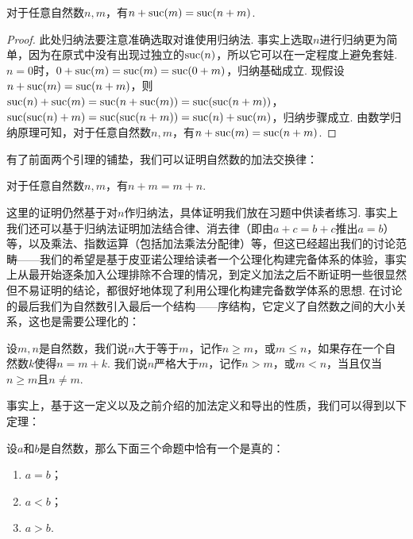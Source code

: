 \begin{lemma}
    对于任意自然数$n,m$，有$n+\operatorname{suc}(m)=\operatorname{suc}(n+m)$.
\end{lemma}
\begin{proof}
    此处归纳法要注意准确选取对谁使用归纳法. 事实上选取$n$进行归纳更为简单，因为在原式中没有出现过独立的$\operatorname{suc}(n)$，所以它可以在一定程度上避免套娃. $n=0$时，$0+\operatorname{suc}(m)=\operatorname{suc}(m)=\operatorname{suc}(0+m)$，归纳基础成立. 现假设$n+\operatorname{suc}(m)=\operatorname{suc}(n+m)$，则$\operatorname{suc}(n)+\operatorname{suc}(m)=\operatorname{suc}(n+\operatorname{suc}(m))=\operatorname{suc}(\operatorname{suc}(n+m))$，$\operatorname{suc}(\operatorname{suc}(n)+m)=\operatorname{suc}(\operatorname{suc}(n+m))=\operatorname{suc}(n)+\operatorname{suc}(m)$，归纳步骤成立. 由数学归纳原理可知，对于任意自然数$n,m$，有$n+\operatorname{suc}(m)=\operatorname{suc}(n+m)$.
\end{proof}

有了前面两个引理的铺垫，我们可以证明自然数的加法交换律：

\begin{theorem}%
    对于任意自然数$n,m$，有$n+m=m+n$.
\end{theorem}
这里的证明仍然基于对$n$作归纳法，具体证明我们放在习题中供读者练习. 事实上我们还可以基于归纳法证明加法结合律、消去律（即由$a+c=b+c$推出$a=b$）等，以及乘法、指数运算（包括加法乘法分配律）等，但这已经超出我们的讨论范畴——我们的希望是基于皮亚诺公理给读者一个公理化构建完备体系的体验，事实上从最开始逐条加入公理排除不合理的情况，到定义加法之后不断证明一些很显然但不易证明的结论，都很好地体现了利用公理化构建完备数学体系的思想. 在讨论的最后我们为自然数引入最后一个结构——序结构，它定义了自然数之间的大小关系，这也是需要公理化的：

\begin{definition}%
    设$m,n$是自然数，我们说$n$大于等于$m$，记作$n\geqslant m$，或$m\leqslant n$，如果存在一个自然数$k$使得$n=m+k$. 我们说$n$严格大于$m$，记作$n>m$，或$m<n$，当且仅当$n\geqslant m$且$n\neq m$.
\end{definition}

事实上，基于这一定义以及之前介绍的加法定义和导出的性质，我们可以得到以下定理：

\begin{theorem}
    设$a$和$b$是自然数，那么下面三个命题中恰有一个是真的：
    \begin{enumerate}
        \item $a=b$；

        \item $a<b$；

        \item $a>b$.
    \end{enumerate}
\end{theorem}

